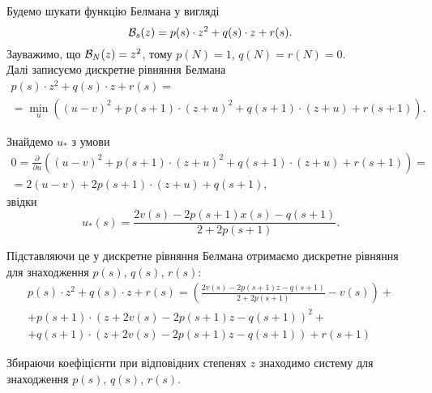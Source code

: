 \begin{solution}
	Будемо шукати функцію Белмана у вигляді \[ \mathcal{B}_s (z) = p (s) \cdot z^2 + q (s) \cdot z + r (s). \] Зауважимо, що $\mathcal{B}_N (z) = z^2$, тому $p (N) = 1$, $q (N) = r (N) = 0$. \\

	Далі записуємо дискретне рівняння Белмана \begin{multline*} p (s) \cdot z^2 + q (s) \cdot z + r (s) = \\ = \min_u ( (u - v)^2 + p (s + 1) \cdot (z + u)^2 + q (s + 1) \cdot (z + u) + r (s + 1) ). \end{multline*}

	Знайдемо $u_*$ з умови \begin{multline*} 0 = \frac{\partial}{\partial u} \left( (u - v)^2 + p (s + 1) \cdot (z + u)^2 + q (s + 1) \cdot (z + u) + r (s + 1) \right) = \\ = 2 (u - v) + 2 p (s + 1) \cdot (z + u) + q (s + 1), \end{multline*} звідки \[ u_* (s) = \frac{ 2 v (s) - 2 p (s + 1) x (s) - q (s + 1) }{ 2 + 2 p (s + 1) }. \]

	Підставляючи це у дискретне рівняння Белмана отримаємо дискретне рівняння для знаходження $p (s)$, $q (s)$, $r (s)$:
	\begin{multline*} p (s) \cdot z^2 + q (s) \cdot z + r (s) = \left( \frac{2 v (s) - 2 p (s + 1) z - q (s + 1)}{2 + 2 p (s + 1)} - v (s) \right) + \\ + p (s + 1) \cdot \left( z + 2 v (s) - 2 p (s + 1) z - q (s + 1) \right)^2 + \\ + q (s + 1) \cdot \left( z + 2 v (s) - 2 p (s + 1) z - q (s + 1) \right) + r (s + 1) \end{multline*}

	Збираючи коефіцієнти при відповідних степенях $z$ знаходимо систему для знаходження $p (s)$, $q (s)$, $r (s)$.
\end{solution}

\begin{problem}
\end{problem}

\begin{solution}
\end{solution}

\begin{problem}
\end{problem}

\begin{solution}
\end{solution}
